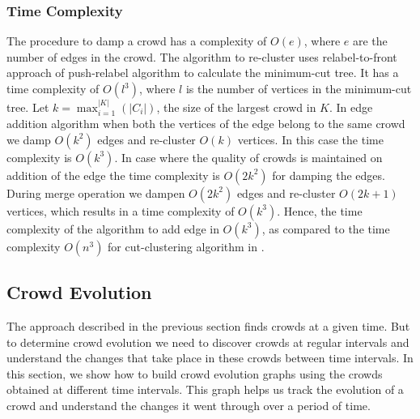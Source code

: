 \documentclass{sig-alternate}
\begin{document}
\subsubsection{Time Complexity} 
The procedure to damp a crowd has a complexity of $O(e)$, where $e$ are the
number of edges in the crowd. The algorithm to re-cluster uses relabel-to-front
approach of push-relabel algorithm \cite{goldberg:push-relabel} to calculate the
minimum-cut tree. It has a time complexity of $O(l^3)$, where $l$ is the number
of vertices in the minimum-cut tree. Let $k = \max_{i = 1}^{|K|}(|C_i|)$, the
size of the largest crowd in $K$. In edge addition algorithm when both the
vertices of the edge belong to the same crowd we damp $O(k^2)$ edges and
re-cluster $O(k)$ vertices. In this case the time complexity is $O(k^3)$. In
case where the quality of crowds is maintained on addition of the edge the time
complexity is $O(2k^2)$ for damping the edges. During merge operation we dampen
$O(2k^2)$ edges and re-cluster $O(2k + 1)$ vertices, which results in a time
complexity of $O(k^3)$. Hence, the time complexity of the algorithm to add edge
in $O(k^3)$, as compared to the time complexity $O(n^3)$ for cut-clustering
algorithm in \cite{flake:cut-clustering}.



\subsection{Crowd Evolution}
\label{sec:crowd-evolution}
The approach described in the previous section finds crowds at a given time. But
to determine crowd evolution we need to discover crowds at regular intervals and
understand the changes that take place in these crowds between time intervals. In
this section, we show how to build crowd evolution graphs using the crowds
obtained at different time intervals. This graph helps us track the evolution of a crowd and
understand the changes it went through over a period of time.


\end{document}
